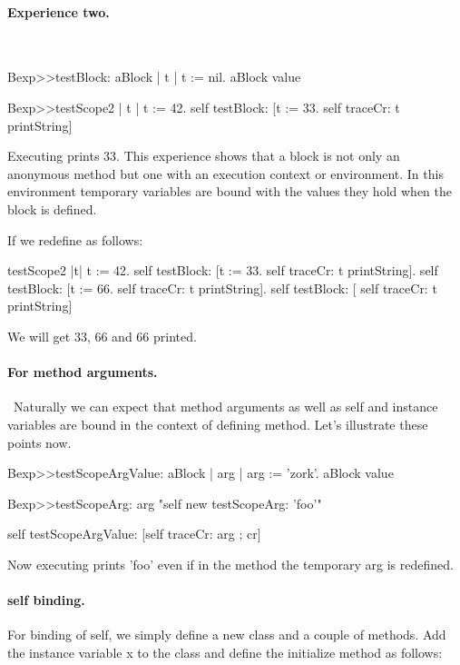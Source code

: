 \documentclass[a4paper,10pt,twoside]{book}
\begin{document}

\paragraph{Experience two.}\ 
\begin{code}{}
Bexp>>testBlock: aBlock
	| t | 
	t := nil. 
	aBlock value 
	
Bexp>>testScope2 
	| t | 
	t := 42. 
	self testBlock: [t := 33. self traceCr: t printString] 	
\end{code}

Executing  prints 33. This experience shows that a block is not only an anonymous method but one with an execution context or environment. In this environment temporary variables are bound with the values they hold when the block 
is defined. 

If we redefine  as follows: 

\begin{code}{}
testScope2 
	|t|
	t := 42.
	self testBlock: [t := 33. self traceCr: t printString].
	self testBlock: [t := 66. self traceCr: t printString].
	self testBlock: [ self traceCr: t printString]
\end{code}

We will get 33, 66 and 66 printed.




\paragraph{For method arguments.}\
Naturally we can expect that method arguments as well as self and instance variables are bound 
in the context of defining method. Let's illustrate these points now. 

\begin{code}{}
Bexp>>testScopeArgValue: aBlock
	| arg | 
	arg := 'zork'.
	aBlock value
	
Bexp>>testScopeArg: arg
	"self new testScopeArg: 'foo'"
	
	self testScopeArgValue: [self traceCr: arg ; cr]
\end{code}

Now executing  prints 'foo' even if in the method  the temporary arg is redefined.
 

\paragraph{self binding.}
For binding of self, we simply define a new class and a couple of methods. 
Add the instance variable x to the class  and define the initialize method as follows:
\end{document}
